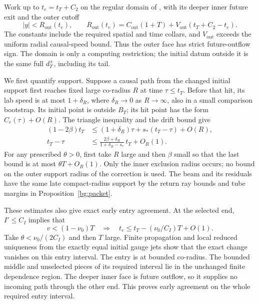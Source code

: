 Work up to $t_e=t_T+C_2$ on the regular domain of
\cite[]{Foundation}, with its deeper inner future exit and
the outer cutoff
\begin{equation}\label{prep:outer-cut}
 |y|<R_{\mathrm{out}}(t_e),\qquad
 R_{\mathrm{out}}(t_e)=C_{\mathrm{out}}(1+T)
                 +V_{\mathrm{out}}(t_T+C_2-t_e).
\end{equation}
The constants include the required spatial and time collars, and
$V_{\mathrm{out}}$ exceeds the uniform radial causal-speed bound.
Thus the outer face has strict future-outflow sign.  The domain is
only a computing restriction; the initial datum outside it is the
same full $d_T^\pm$, including its tail.

We first quantify support.  Suppose a causal path from the changed
initial support first reaches fixed large co-radius $R$ at time
$\tau\le t_T$.  Before that hit, its lab speed is at most
$1+\delta_R$, where $\delta_R\to0$ as $R\to\infty$, also in a
small comparison bootstrap.  Its initial point is outside $B_T$;
its hit point has the form $C_e(\tau)+O(R)$.  The triangle inequality
and the drift bound give
\begin{align}
 (1-2\beta)t_T
 &\le (1+\delta_R)\tau+s_*(t_T-\tau)+O(R),
                                   \label{prep:first-hit}\\
 t_T-\tau
 &\le \frac{2\beta+\delta_R}{1+\delta_R-s_*}\,t_T+O_R(1).
                                   \label{prep:late-hit}
\end{align}
For any prescribed $\theta>0$, first take $R$ large and then
$\beta$ small so that the last bound is at most $\theta T+O_R(1)$.
Only the inner exclusion radius occurs; no bound on the outer
support radius of the correction is used.  The beam and its
residuals have the same late compact-radius support by the return
ray bounds and tube margins in Proposition~\ref{bg:packet}.

These estimates also give exact early entry agreement.  At the
selected end, $I'\le C_I$ implies that
\[
 v<(1-\nu_0)T\quad\Longrightarrow\quad
 t_e\le t_T-(\nu_0/C_I)T+O(1).
\]
Take $\theta<\nu_0/(2C_I)$ and then $T$ large.  Finite propagation
and local reduced uniqueness from the exactly equal initial gauge
jets show that the exact change vanishes on this entry interval.
The entry is at bounded co-radius.  The bounded middle and
unselected pieces of its required interval lie in the unchanged
finite dependence region.  The deeper inner face is future outflow,
so it supplies no incoming path through the other end.  This proves
early agreement on the whole required entry interval.

